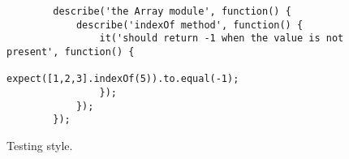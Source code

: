 
\begin{figure}[H]
	\centering
	\begin{lstlisting}
		describe('the Array module', function() {
			describe('indexOf method', function() {
				it('should return -1 when the value is not present', function() {
					expect([1,2,3].indexOf(5)).to.equal(-1);
				});
			});
		});
	\end{lstlisting}
	\caption[Testing style]{Testing style.}
	\label{fig:testing_style}
\end{figure}
